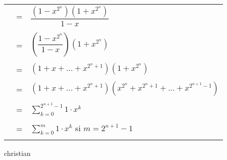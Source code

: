 \begin{enumerate}
\begin{enumerate}[\bfseries (a)]
\begin{center}
\begin{tabular}{r c l}
                            &=&$\dfrac{(1-x^{2^n})(1+x^{2^n})}{1-x}$\\\\
                            &=&$\left( \dfrac{1 - x^{2^n}}{1-x} \right) (1+x^{2^n})$\\\\
                            &=&$(1+x+...+x^{2^n + 1})(1 + x^{2^n})$\\\\
                            &=&$(1+x+...+x^{2^n + 1})(x^{2^n} + x^{2^n +1} + ... + x^{2^{n+1} - 1})$\\\\
                            &=&$\displaystyle\sum_{k=0}^{2^{n+1} - 1} 1 \cdot x^k$\\\\
                            &=&$\displaystyle\sum_{k=0}^{m} 1 \cdot x^k$ si $m = 2^{n+1} - 1$\\\\
                        \end{tabular}
                    \end{center}
            \end{enumerate}


    \end{enumerate}
christian
